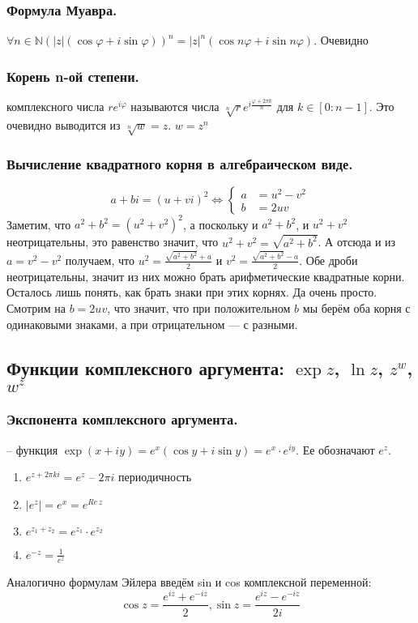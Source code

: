 \subsubsection{Формула Муавра.}
 $\forall n\in\mathbb{N}(|z|(\cos\varphi+i\sin\varphi))^n=|z|^n(\cos n\varphi+i\sin n\varphi)$. Очевидно

 \subsubsection{Корень n-ой степени.}

  комплексного числа $re^{i\varphi}$ называются числа $\sqrt[n]re^{i\frac{\varphi+2\pi k}n}$ для $k\in[0:n-1]$. Это очевидно выводится из $\sqrt[n]{w} = z$. $w = z^n$

 \subsubsection{Вычисление квадратного корня в алгебраическом виде.}
            \[
            a+bi=(u+vi)^2\Leftrightarrow
            \left\{\begin{aligned}
                a&=u^2-v^2\\
                b&=2uv
            \end{aligned}\right.
            \]
            Заметим, что $a^2+b^2=(u^2+v^2)^2$, а поскольку и $a^2+b^2$, и $u^2+v^2$ неотрицательны, это равенство значит, что $u^2+v^2=\sqrt{a^2+b^2}$. А отсюда и из $a=v^2-v^2$ получаем, что $u^2=\frac{\sqrt{a^2+b^2}+a}2$ и $v^2=\frac{\sqrt{a^2+b^2}-a}2$. Обе дроби неотрицательны, значит из них можно брать арифметические квадратные корни. Осталось лишь понять, как брать знаки при этих корнях. Да очень просто. Смотрим на $b=2uv$, что значит, что при положительном $b$ мы берём оба корня с одинаковыми знаками, а при отрицательном --- с разными.


\subsection{Функции комплексного аргумента: $\exp z$, $\ln z$, $z^w$, $w^z$}
\subsubsection{Экспонента комплексного аргумента.}


 -- функция $\exp(x+i y)=e^x(\cos y+i\sin y)=e^x\cdot e^{iy}$. Ее обозначают $e^z$.

\begin{enumerate}
    \item $e^{z + 2\pi ki} = e^z$ -- $2\pi i$ периодичность
    \item $|e^z| = e^x=e^{Re\,z}$
    \item $e^{z_1 + z_2} = e^{z_1} \cdot e^{z_2}$
    \item $e^{-z} = \frac{1}{e^z}$
\end{enumerate}
 Аналогично формулам Эйлера введём sin и cos комплексной переменной:
          $$\cos{z}=\frac{e^{iz}+e^{-iz}}{2},\sin{z}=\frac{e^{iz}-e^{-iz}}{2i}$$
